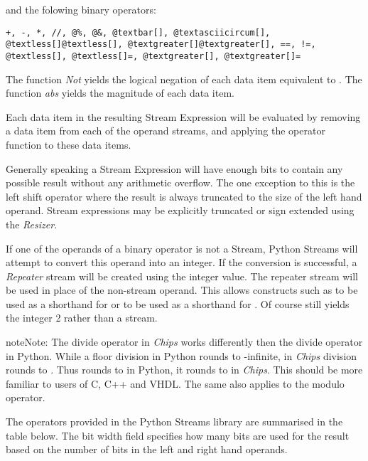 \documentclass[letterpaper,10pt,english]{sphinxmanual}
\begin{document}
and the folowing binary operators:

\begin{Verbatim}[commandchars=@\[\]]
+, -, *, //, @%, @&, @textbar[], @textasciicircum[], @textless[]@textless[], @textgreater[]@textgreater[], ==, !=, @textless[], @textless[]=, @textgreater[], @textgreater[]=
\end{Verbatim}

The function \emph{Not} yields the logical negation of each data item equivalent to
. The function \emph{abs} yields the magnitude of each data item.

Each data item in the resulting Stream Expression will be evaluated by removing
a data item from each of the operand streams, and applying the operator
function to these data items.

Generally speaking a Stream Expression will have enough bits to contain any
possible result without any arithmetic overflow. The one exception to this is
the left shift operator where the result is always truncated to the size of the
left hand operand. Stream expressions may be explicitly truncated or sign
extended using the \emph{Resizer}.

If one of the operands of a binary operator is not a Stream, Python Streams
will attempt to convert this operand into an integer. If the conversion is
successful, a \emph{Repeater} stream will be created using the integer value. The
repeater stream will be used in place of the non-stream operand. This allows
constructs such as  to be used as a shorthand for  or  to be used as
a shorthand for .  Of course 
still yields the integer 2 rather than a stream.

\begin{notice}{note}{Note:}
The divide \code{//} operator in \emph{Chips} works differently then the divide
operator in Python.  While a floor division in Python rounds to -infinite,
in \emph{Chips} division rounds to . Thus  rounds to  in
Python, it rounds to  in \emph{Chips}. This should be more familiar to
users of C, C++ and VHDL. The same also applies to the modulo \code{\%}
operator.
\end{notice}

The operators provided in the Python Streams library are summarised in the
table below. The bit width field specifies how many bits are used for the
result based on the number of bits in the left and right hand operands.
\end{document}
